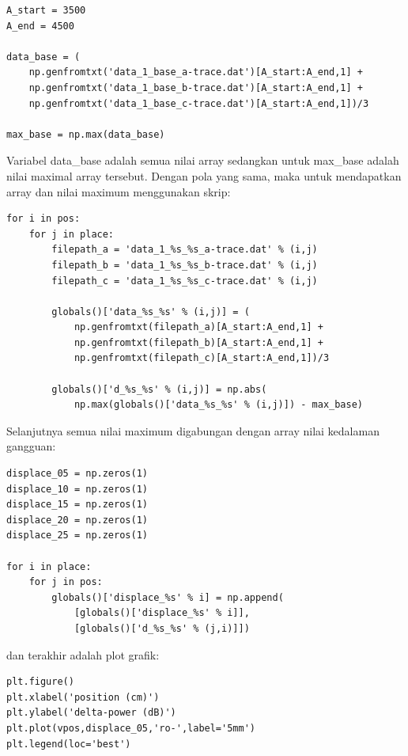\documentclass[12pt]{article}
\begin{document}
	\begin{verbatim}
A_start = 3500
A_end = 4500

data_base = (
	np.genfromtxt('data_1_base_a-trace.dat')[A_start:A_end,1] +
	np.genfromtxt('data_1_base_b-trace.dat')[A_start:A_end,1] +
	np.genfromtxt('data_1_base_c-trace.dat')[A_start:A_end,1])/3

max_base = np.max(data_base)
	\end{verbatim}
	
	Variabel data\_base adalah semua nilai array sedangkan untuk max\_base adalah nilai	maximal array tersebut.
	Dengan pola yang sama, maka untuk mendapatkan array dan nilai maximum menggunakan skrip:
	
	\begin{verbatim}
for i in pos:
	for j in place:
		filepath_a = 'data_1_%s_%s_a-trace.dat' % (i,j)
		filepath_b = 'data_1_%s_%s_b-trace.dat' % (i,j)
		filepath_c = 'data_1_%s_%s_c-trace.dat' % (i,j)
		
		globals()['data_%s_%s' % (i,j)] = (
			np.genfromtxt(filepath_a)[A_start:A_end,1] +
			np.genfromtxt(filepath_b)[A_start:A_end,1] +
			np.genfromtxt(filepath_c)[A_start:A_end,1])/3
		
		globals()['d_%s_%s' % (i,j)] = np.abs(
			np.max(globals()['data_%s_%s' % (i,j)]) - max_base)
	\end{verbatim}
	
	Selanjutnya semua nilai maximum digabungan dengan array nilai kedalaman gangguan:
	
	\begin{verbatim}
displace_05 = np.zeros(1)
displace_10 = np.zeros(1)
displace_15 = np.zeros(1)
displace_20 = np.zeros(1)
displace_25 = np.zeros(1)
	
for i in place:            
	for j in pos:
		globals()['displace_%s' % i] = np.append(
			[globals()['displace_%s' % i]],
			[globals()['d_%s_%s' % (j,i)]])
	\end{verbatim}
	
	dan terakhir adalah plot grafik:
	
	\begin{verbatim}
plt.figure()
plt.xlabel('position (cm)')
plt.ylabel('delta-power (dB)')
plt.plot(vpos,displace_05,'ro-',label='5mm')
plt.legend(loc='best')
	\end{verbatim}
	
\newpage
\end{document}
